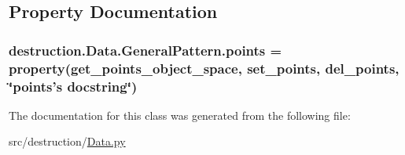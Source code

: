 \subsection{Property Documentation}
\hypertarget{classdestruction_1_1_data_1_1_general_pattern_aedf66fae26d15917d7dfa55af5623958}{
\subsubsection[{points}]{\setlength{\rightskip}{0pt plus 5cm}destruction.\-Data.\-General\-Pattern.\-points = property({\bf get\-\_\-points\-\_\-object\-\_\-space}, {\bf set\-\_\-points}, {\bf del\-\_\-points}, \char`\"{}points's docstring\char`\"{})\hspace{0.3cm}{\ttfamily [static]}}}\label{classdestruction_1_1_data_1_1_general_pattern_aedf66fae26d15917d7dfa55af5623958}


The documentation for this class was generated from the following file\-:\begin{DoxyCompactItemize}
\item 
src/destruction/\hyperlink{_data_8py}{Data.\-py}\end{DoxyCompactItemize}
